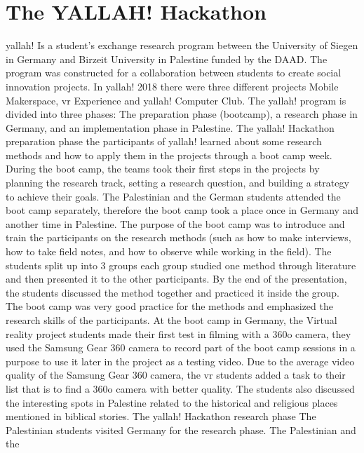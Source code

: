 \section{The YALLAH! Hackathon}

\acrshort{yallah!} Is a student’s exchange research program between the University of Siegen in
Germany and Birzeit University in Palestine funded by the DAAD. The program was
constructed for a collaboration between students to create social innovation projects.
In \acrshort{yallah!} 2018 there were three different projects Mobile Makerspace, \acrshort{vr} Experience and
\acrshort{yallah!} Computer Club. The \acrshort{yallah!} program is divided into three phases: The preparation
phase (bootcamp), a research phase in Germany, and an implementation phase in Palestine.
The \acrshort{yallah!} Hackathon preparation phase
the participants of \acrshort{yallah!} learned about some research methods and how to apply them in
the projects through a boot camp week. During the boot camp, the teams took their first
steps in the projects by planning the research track, setting a research question, and building
a strategy to achieve their goals.
The Palestinian and the German students attended the boot camp separately, therefore the
boot camp took a place once in Germany and another time in Palestine. The purpose of the
boot camp was to introduce and train the participants on the research methods (such as how
to make interviews, how to take field notes, and how to observe while working in the field).
The students split up into 3 groups each group studied one method through literature and
then presented it to the other participants. By the end of the presentation, the students
discussed the method together and practiced it inside the group. The boot camp was very
good practice for the methods and emphasized the research skills of the participants. At the
boot camp in Germany, the Virtual reality project students made their first test in filming with
a 360o camera, they used the Samsung Gear 360 camera to record part of the boot camp
sessions in a purpose to use it later in the project as a testing video. Due to the average video
quality of the Samsung Gear 360 camera, the \acrshort{vr} students added a task to their list that is to
find a 360o camera with better quality. The students also discussed the interesting spots in
Palestine related to the historical and religious places mentioned in biblical stories.
The \acrshort{yallah!} Hackathon research phase
The Palestinian students visited Germany for the research phase. The Palestinian and the
